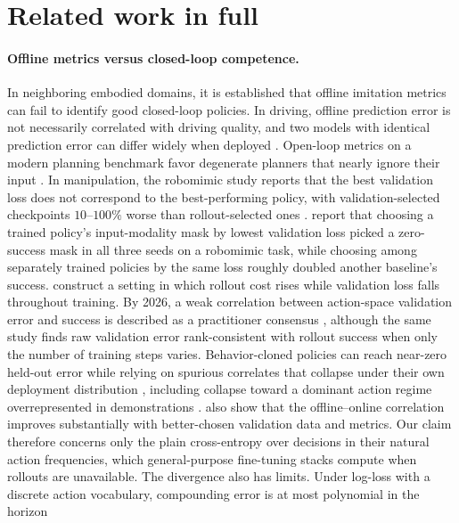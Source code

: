 \section{Related work in full}
\label{app:related}

\paragraph{Offline metrics versus closed-loop competence.}
In neighboring embodied domains, it is established that offline imitation metrics can fail to
identify good closed-loop policies. In driving, offline prediction error is not necessarily
correlated with driving quality, and two models with identical prediction error can differ widely
when deployed \citep{codevilla2018offline}. Open-loop metrics on a modern planning benchmark favor
degenerate planners that nearly ignore their input \citep{dauner2023parting}. In manipulation, the
robomimic study reports that the best validation loss does not correspond to the best-performing
policy, with validation-selected checkpoints $10$--$100\%$ worse than rollout-selected ones
\citep{mandlekar2021robomimic}. \citet{hao2023masked} report that choosing a trained policy's
input-modality mask by lowest validation loss picked a zero-success mask in all three seeds on a
robomimic task, while choosing among separately trained policies by the same loss roughly doubled
another baseline's success. \citet{simchowitz2025pitfalls} construct a setting in which rollout cost
rises while validation loss falls throughout training. By 2026, a weak correlation between
action-space validation error and success is described as a practitioner consensus
\citep{huang2026critical}, although the same study finds raw validation error rank-consistent with
rollout success when only the number of training steps varies. Behavior-cloned policies can reach
near-zero held-out error while relying on spurious correlates that collapse under their own
deployment distribution \citep{dehaan2019causal}, including collapse toward a dominant action
regime overrepresented in demonstrations \citep{codevilla2019exploring}.
\citet{codevilla2018offline} also show that the offline--online correlation improves substantially
with better-chosen validation data and metrics. Our claim therefore concerns only the plain
cross-entropy over decisions in their natural action frequencies, which general-purpose fine-tuning
stacks compute when rollouts are unavailable. The divergence also has limits. Under log-loss with a
discrete action vocabulary, compounding error is at most polynomial in the horizon
